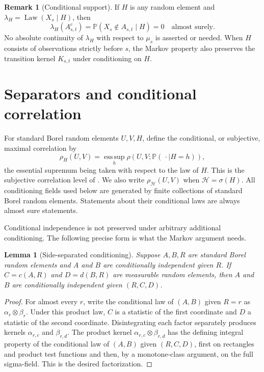 \documentclass[11pt]{amsart}
\numberwithin{equation}{section}
\newtheorem{lemma}[theorem]{Lemma}
\theoremstyle{definition}
\newtheorem{remark}[theorem]{Remark}
\newcommand{\PP}{\mathbb P}
\newcommand{\cH}{\mathcal H}
\newcommand{\Law}{\operatorname{Law}}
\begin{document}
\begin{remark}[Conditional support]\label{rem:conditional-support}
If $H$ is any random element and $\lambda_H=\Law(X_s\mid H)$, then
\[
\lambda_H(A_{s,t}^c)=\PP(X_s\notin A_{s,t}\mid H)=0
\quad\text{almost surely}.
\]
No absolute continuity of $\lambda_H$ with respect to $\mu_s$ is asserted or needed. When $H$ consists of observations strictly before $s$, the Markov property also preserves the transition kernel $K_{s,t}$ under conditioning on $H$.
\end{remark}

\section{Separators and conditional correlation}\label{sec:separators}

For standard Borel random elements $U,V,H$, define the conditional, or subjective, maximal correlation by
\begin{equation}\label{eq:subjective}
\rho_H(U,V)=\operatorname*{ess\,sup}_{h}
\rho(U,V;\PP(\,\cdot\mid H=h)),
\end{equation}
the essential supremum being taken with respect to the law of $H$. This is the subjective correlation level of \cite[Section~3.1]{Peyre2010}. We also write $\rho_{\cH}(U,V)$ when $\cH=\sigma(H)$. All conditioning fields used below are generated by finite collections of standard Borel random elements. Statements about their conditional laws are always almost sure statements.

Conditional independence is not preserved under arbitrary additional conditioning. The following precise form is what the Markov argument needs.

\begin{lemma}[Side-separated conditioning]\label{lem:side-separated}
Suppose $A,B,R$ are standard Borel random elements and $A$ and $B$ are conditionally independent given $R$. If $C=c(A,R)$ and $D=d(B,R)$ are measurable random elements, then $A$ and $B$ are conditionally independent given $(R,C,D)$.
\end{lemma}

\begin{proof}
For almost every $r$, write the conditional law of $(A,B)$ given $R=r$ as $\alpha_r\otimes\beta_r$. Under this product law, $C$ is a statistic of the first coordinate and $D$ a statistic of the second coordinate. Disintegrating each factor separately produces kernels $\alpha_{r,c}$ and $\beta_{r,d}$. The product kernel $\alpha_{r,c}\otimes\beta_{r,d}$ has the defining integral property of the conditional law of $(A,B)$ given $(R,C,D)$, first on rectangles and product test functions and then, by a monotone-class argument, on the full sigma-field. This is the desired factorization.
\end{proof}
\end{document}
